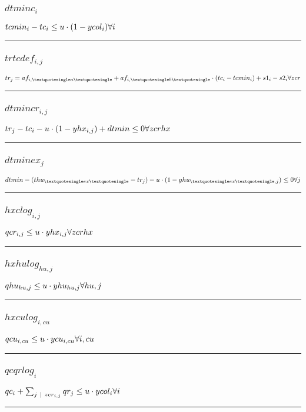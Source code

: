 \documentclass[11pt]{article}
\begin{document}
\subsubsection*{$dtminc_{i}$}
$
tcmin_{i} - tc_{i} \leq u \cdot (1 - ycol_{i})\hfill \forall i
$
\vspace{5pt}
\hrule
\subsubsection*{$trtcdef_{i,j}$}
$
tr_{j} = af_{i,\textquotesingle a \textquotesingle} + af_{i,\textquotesingle b \textquotesingle} \cdot (tc_{i} - tcmin_{i}) + s1_{i} - s2_{i}\hfill \forall zcr
$
\vspace{5pt}
\hrule
\subsubsection*{$dtmincr_{i,j}$}
$
tr_{j} - tc_{i} - u \cdot (1 - yhx_{i,j}) + dtmin \leq 0\hfill \forall zcrhx
$
\vspace{5pt}
\hrule
\subsubsection*{$dtminex_{j}$}
$
dtmin - (thu_{\textquotesingle ex \textquotesingle} - tr_{j}) - u \cdot (1 - yhu_{\textquotesingle ex \textquotesingle,j}) \leq 0\hfill \forall j
$
\vspace{5pt}
\hrule
\subsubsection*{$hxclog_{i,j}$}
$
qcr_{i,j} \leq u \cdot yhx_{i,j}\hfill \forall zcrhx
$
\vspace{5pt}
\hrule
\subsubsection*{$hxhulog_{hu,j}$}
$
qhu_{hu,j} \leq u \cdot yhu_{hu,j}\hfill \forall hu,j
$
\vspace{5pt}
\hrule
\subsubsection*{$hxculog_{i,cu}$}
$
qcu_{i,cu} \leq u \cdot ycu_{i,cu}\hfill \forall i,cu
$
\vspace{5pt}
\hrule
\subsubsection*{$qcqrlog_{i}$}
$
qc_{i} + \sum_{j ~ | ~ zcr_{i,j}} qr_{j} \leq u \cdot ycol_{i}\hfill \forall i
$
\vspace{5pt}
\hrule
\end{document}
